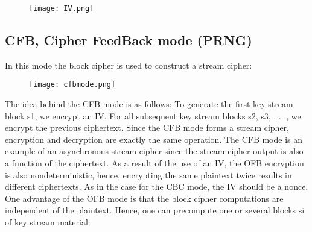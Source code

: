 \documentclass{article}
\begin{document}
\begin{figure}[H]
    \centering
    \texttt{[image: IV.png]}
\end{figure}

\subsection{CFB, Cipher FeedBack mode (PRNG)}
In this mode the block cipher is used to construct a stream cipher:

\begin{figure}[htp]
    \centering
    \texttt{[image: cfbmode.png]}
    \label{fig:my_label}
\end{figure}

The idea behind the CFB mode is as follows: To generate the first key stream block
s1, we encrypt an IV. For all subsequent key stream blocks s2, s3, . . ., we encrypt the
previous ciphertext.
Since the CFB mode forms a stream cipher, encryption and decryption are exactly
the same operation. The CFB mode is an example of an asynchronous stream cipher since the stream cipher output is also a function of the ciphertext.
\vspace{1cm}
As a result of the use of an IV, the OFB encryption is also nondeterministic,
hence, encrypting the same plaintext twice results in different ciphertexts. As in the
case for the CBC mode, the IV should be a nonce. One advantage of the OFB mode
is that the block cipher computations are independent of the plaintext. Hence, one
can precompute one or several blocks si of key stream material.
\vspace{1cm}
\end{document}
